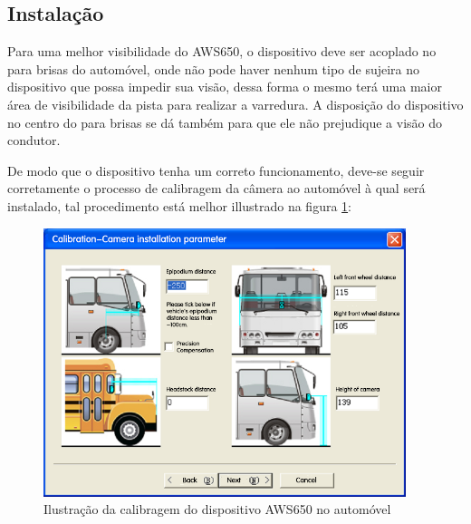 \subsection{Instalação}
Para uma melhor visibilidade do AWS650, o dispositivo deve ser acoplado no para brisas do automóvel, onde não pode haver nenhum tipo de sujeira no dispositivo que possa impedir sua visão, dessa forma o mesmo terá uma maior área de visibilidade da pista para realizar a varredura. A disposição do dispositivo no centro do para brisas se dá também para que ele não prejudique a visão do condutor.

De modo que o dispositivo tenha um correto funcionamento, deve-se seguir corretamente o processo de calibragem da câmera ao automóvel à qual será instalado, tal procedimento está melhor illustrado na figura \ref{fig:instalacao_camera}:


\begin{figure}[h]
  \centering
  \includegraphics[width=400px, scale=1]{figuras/instalacao_camera}
  \caption{Ilustração da calibragem do dispositivo AWS650 no automóvel}
\label{fig:instalacao_camera}
\end{figure}

